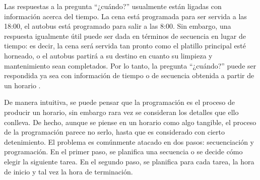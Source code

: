 \documentclass[draft,12pt,headsepline,footsepline,paper=letter]{scrreprt}
\begin{document}
Las respuestas a la pregunta “¿cuándo?” usualmente están ligadas con información acerca del tiempo. La cena está programada para ser servida a las 18:00, el autobus está programado para salir a las 8:00. Sin embargo, una respuesta igualmente útil puede ser dada en términos de secuencia en lugar de tiempo: es decir, la cena será servida tan pronto como el platillo principal esté horneado, o el autobus partirá a su destino en cuanto su limpieza y mantenimiento sean completados. Por lo tanto, la pregunta “¿cuándo?” puede ser respondida ya sea con información de tiempo o de secuencia obtenida a partir de un horario \citep[p.~1]{Baker2009}.

De manera intuitiva, se puede pensar que la programación es el proceso de producir un horario, sin embargo rara vez se consideran los detalles que ello conlleva. De hecho, aunque se piense en un horario como algo tangible, el proceso de la programación parece no serlo, hasta que es considerado con cierto detenimiento. El problema es comúnmente atacado en dos pasos: secuenciación y programación. En el primer paso, se planifica una secuencia o se decide cómo elegir la siguiente tarea. En el segundo paso, se planifica para cada tarea, la hora de inicio y tal vez la hora de terminación\citep[p.~2]{Baker2009}. 
\end{document}
